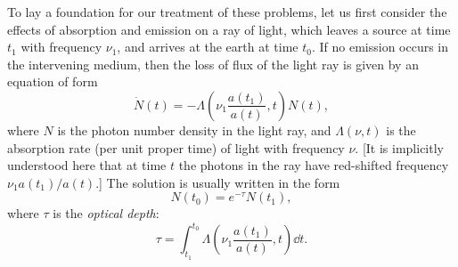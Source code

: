 To lay a foundation for our treatment of these problems, let us first consider
the effects of absorption and emission on a ray of light, which leaves a source
at time \(t_1\) with frequency \(\nu_1\), and arrives at the earth at time
\(t_0\). If no emission occurs in the intervening medium, then the loss of flux
of the light ray is given by an equation of form
\begin{equation}
  \dot N(t)
  =
  -\Lambda\left(\nu_1\frac{a(t_1)}{a(t)},t\right)N(t),
  \tag{15.4.1}\label{eq:15.4.1}
\end{equation}
where \(N\) is the photon number density in the light ray, and
\(\Lambda(\nu,t)\) is the absorption rate (per unit proper time) of light with
frequency \(\nu\). [It is implicitly understood here that at time \(t\) the
photons in the ray have red-shifted frequency
\(\nu_1a(t_1)/a(t)\).] The solution is usually written in the form
\begin{equation}
  N(t_0)=e^{-\tau}N(t_1),
  \tag{15.4.2}\label{eq:15.4.2}
\end{equation}
where \(\tau\) is the \emph{optical depth}:
\begin{equation}
  \tau
  =
  \int_{t_1}^{t_0}
  \Lambda\left(\nu_1\frac{a(t_1)}{a(t)},t\right)\dd t.
  \tag{15.4.3}\label{eq:15.4.3}
\end{equation}

